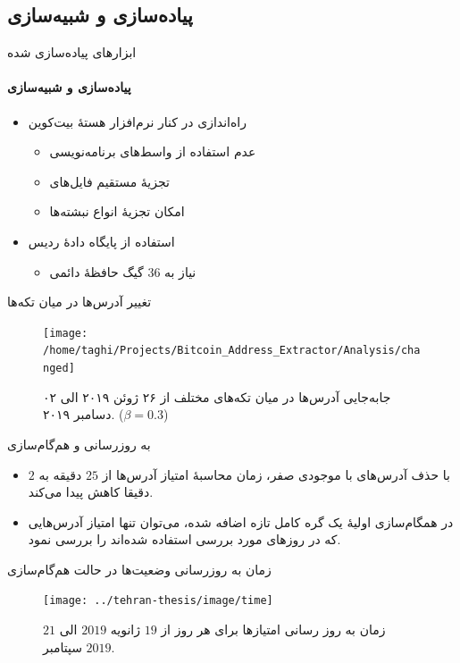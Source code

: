 \documentclass{beamer}
\begin{document}
\subsection{پیاده‌سازی و شبیه‌سازی}

\begin{frame}{ابزارهای پیاده‌سازی شده}
	\framesubtitle{پیاده‌سازی و شبیه‌سازی}
	\begin{itemize}
		\item {%
			راه‌اندازی در کنار نرم‌افزار هستهٔ بیت‌کوین
		\begin{itemize}
			\item عدم استفاده از واسط‌های برنامه‌نویسی
			\item تجزیهٔ مستقیم فایل‌های 
			\item امکان تجزیهٔ انواع نبشته‌ها
		\end{itemize}}
		\item {%
		استفاده از پایگاه دادهٔ ردیس
		\begin{itemize}
			\item {%
			نیاز به $36$ گیگ حافظهٔ دائمی}
		\end{itemize}
}
	\end{itemize}
\end{frame}

\begin{frame}{تغییر آدرس‌ها در میان تکه‌ها}
	\begin{figure}[h]
		\centering
		\texttt{[image: /home/taghi/Projects/Bitcoin\_Address\_Extractor/Analysis/changed]}
		\caption{%
			جابه‌جایی آدرس‌ها در میان تکه‌های مختلف از ۲۶ ژوئن ۲۰۱۹ الی ۰۲ دسامبر ۲۰۱۹. ($\beta=0.3$)
		}
		\label{fig:changed}
	\end{figure}
\end{frame}

\begin{frame}{به روزرسانی و هم‌گام‌سازی}
	\begin{itemize}
		\item {%
		با حذف آدرس‌های با موجودی صفر، زمان محاسبهٔ امتیاز آدرس‌ها از $25$ دقیقه به $2$ دقیقا کاهش پیدا می‌کند.}
		\item {%
		در همگام‌سازی اولیهٔ یک گره کامل تازه‌ اضافه شده، می‌توان تنها امتیاز آدرس‌هایی که در روز‌های مورد بررسی استفاده شده‌اند را بررسی نمود.}
	\end{itemize}
\end{frame}

\begin{frame}{زمان به روز‌رسانی وضعیت‌ها در حالت هم‌گام‌سازی}
\begin{figure}[h!]
	\centering
	\texttt{[image: ../tehran-thesis/image/time]}
	\caption[زمان‌ به روز رسانی وضعیت امتیاز‌ها برای هر روز]{ زمان‌ به روز رسانی امتیاز‌ها برای هر روز از  $19$ ژانویه $2019$ الی $21$ سپتامبر $2019$.}
		\label{fig:time}
	\end{figure}
\end{frame}
\end{document}

